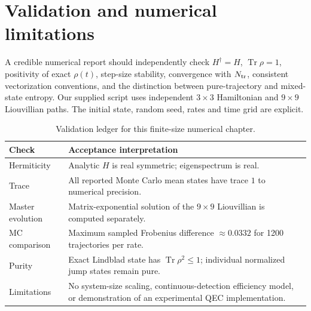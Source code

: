 \documentclass[11pt,a4paper]{article}
\newcommand{\tr}{\operatorname{Tr}}\newcommand{\D}{\mathcal D}\newcommand{\ket}[1]{|#1\rangle}\newcommand{\bra}[1]{\langle#1|}\newcommand{\E}{\mathbb E}\newcommand{\ip}[2]{\langle#1|#2\rangle}
\begin{document}
\section{Validation and numerical limitations}
A credible numerical report should independently check $H^\dagger=H$, $\tr\rho=1$, positivity of exact $\rho(t)$, step-size stability, convergence with $N_{\rm tr}$, consistent vectorization conventions, and the distinction between pure-trajectory and mixed-state entropy. Our supplied script uses independent $3\times3$ Hamiltonian and $9\times9$ Liouvillian paths. The initial state, random seed, rates and time grid are explicit.
\begin{table}[ht]\centering\small
\caption{Validation ledger for this finite-size numerical chapter.}
\begin{tabularx}{\linewidth}{@{}lX@{}}\toprule
Check & Acceptance interpretation\\\midrule
Hermiticity & Analytic $H$ is real symmetric; eigenspectrum is real.\\
Trace & All reported Monte Carlo mean states have trace $1$ to numerical precision.\\
Master evolution & Matrix-exponential solution of the $9\times9$ Liouvillian is computed separately.\\
MC comparison & Maximum sampled Frobenius difference $\approx0.0332$ for 1200 trajectories per rate.\\
Purity & Exact Lindblad state has $\tr\rho^2\le1$; individual normalized jump states remain pure.\\
Limitations & No system-size scaling, continuous-detection efficiency model, or demonstration of an experimental QEC implementation.\\\bottomrule
\end{tabularx}
\end{table}
\end{document}
